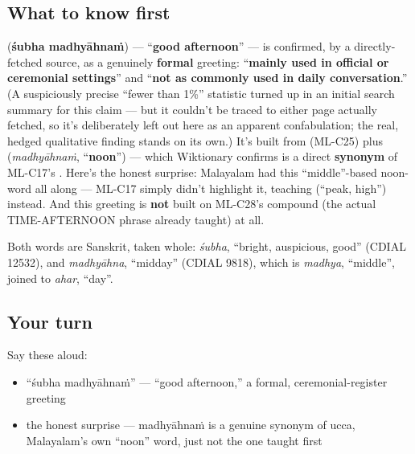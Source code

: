 \subsection*{What to know first}
\textbf{ } (\textbf{śubha madhyāhnaṁ}) — \textquotedblleft{}\textbf{good afternoon}\textquotedblright{} — is confirmed, by a directly-fetched source, as a genuinely \textbf{formal} greeting: \textquotedblleft{}\textbf{mainly used in official or ceremonial settings}\textquotedblright{} and \textquotedblleft{}\textbf{not as commonly used in daily conversation}.\textquotedblright{} (A suspiciously precise \textquotedblleft{}fewer than 1\%\textquotedblright{} statistic turned up in an initial search summary for this claim — but it couldn't be traced to either page actually fetched, so it's deliberately left out here as an apparent confabulation; the real, hedged qualitative finding stands on its own.) It's built from \textbf{} (ML-C25) plus \textbf{} (\emph{madhyāhnaṁ}, \textquotedblleft{}\textbf{noon}\textquotedblright{}) — which Wiktionary confirms is a direct \textbf{synonym} of ML-C17's \textbf{}. Here's the honest surprise: Malayalam had this \textquotedblleft{}middle\textquotedblright{}-based noon-word all along — ML-C17 simply didn't highlight it, teaching \textbf{} (\textquotedblleft{}peak, high\textquotedblright{}) instead. And this greeting is \textbf{not} built on ML-C28's \textbf{} compound (the actual TIME-AFTERNOON phrase already taught) at all.

\begin{cousinweb}
Both words are Sanskrit, taken whole: \emph{śubha}, \textquotedblleft{}bright, auspicious, good\textquotedblright{} (CDIAL 12532), and \emph{madhyāhna}, \textquotedblleft{}midday\textquotedblright{} (CDIAL 9818), which is \emph{madhya}, \textquotedblleft{}middle\textquotedblright{}, joined to \emph{ahar}, \textquotedblleft{}day\textquotedblright{}.
\end{cousinweb}

\subsection*{Your turn}
Say these aloud:

\begin{itemize}
\raggedright
  \item \textquotedblleft{}śubha madhyāhnaṁ\textquotedblright{} — \textquotedblleft{}good afternoon,\textquotedblright{} a formal, ceremonial-register greeting
  \item the honest surprise — madhyāhnaṁ is a genuine synonym of ucca, Malayalam's own \textquotedblleft{}noon\textquotedblright{} word, just not the one taught first
\end{itemize}

